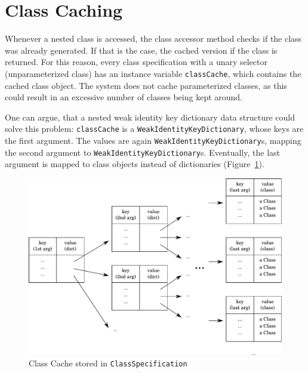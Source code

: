 \section{Class Caching}
Whenever a nested class is accessed, the class accessor method checks if the class was already generated. If that is the case, the cached version if the class is returned. For this reason, every class specification with a unary selector (unparameterized class) has an instance variable \texttt{classCache}, which contains the cached class object. The system does not cache parameterized classes, as this could result in an excessive number of classes being kept around.

One can argue, that a nested weak identity key dictionary data structure could solve this problem: \texttt{classCache} is a \texttt{WeakIdentityKeyDictionary}, whose keys are the first argument. The values are again \texttt{WeakIdentityKeyDictionary}s, mapping the second argument to \texttt{WeakIdentityKeyDictionary}s. Eventually, the last argument is mapped to class objects instead of dictionaries (Figure~\ref{fig:impl_class_cache}).
\begin{figure}[!htp]
	\includegraphics[width=\textwidth]{class_cache.pdf}
	\centering
	\caption{Class Cache stored in \texttt{ClassSpecification}}
	\label{fig:impl_class_cache}
\end{figure}

